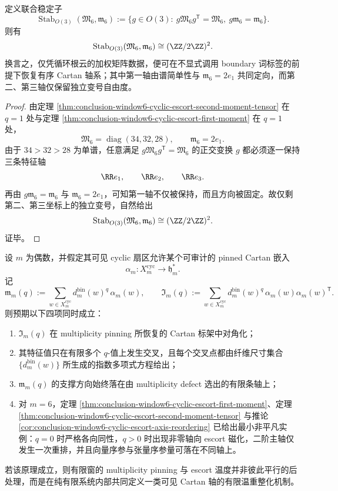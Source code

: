 \begin{corollary}\label{cor:conclusion-window6-moment-tensor-axis-pinning}
定义联合稳定子
\[
\operatorname{Stab}_{O(3)}(\mathfrak M_6,\mathfrak m_6)
:=
\bigl\{
g\in O(3):
\ g\mathfrak M_6 g^{\mathsf T}=\mathfrak M_6,\ 
g\mathfrak m_6=\mathfrak m_6
\bigr\}.
\]
则有
\[
\operatorname{Stab}_{O(3)}(\mathfrak M_6,\mathfrak m_6)\cong (\ZZ/2\ZZ)^2.
\]
换言之，仅凭循环根云的加权矩阵数据，便可在不显式调用 boundary 词标签的前提下恢复有序 Cartan 轴系；其中第一轴由谱简单性与 \(\mathfrak m_6=2e_1\) 共同定向，而第二、第三轴仅保留独立变号自由度。
\end{corollary}
\begin{proof}
由定理 \ref{thm:conclusion-window6-cyclic-escort-second-moment-tensor} 在 \(q=1\) 处与定理 \ref{thm:conclusion-window6-cyclic-escort-first-moment} 在 \(q=1\) 处，
\[
\mathfrak M_6=\operatorname{diag}(34,32,28),
\qquad
\mathfrak m_6=2e_1.
\]
由于 \(34>32>28\) 为单谱，任意满足 \(g\mathfrak M_6 g^{\mathsf T}=\mathfrak M_6\) 的正交变换 \(g\) 都必须逐一保持三条特征轴
\[
\RR e_1,\qquad \RR e_2,\qquad \RR e_3.
\]
再由 \(g\mathfrak m_6=\mathfrak m_6\) 与 \(\mathfrak m_6=2e_1\)，可知第一轴不仅被保持，而且方向被固定。故仅剩第二、第三坐标上的独立变号，自然给出
\[
\operatorname{Stab}_{O(3)}(\mathfrak M_6,\mathfrak m_6)\cong (\ZZ/2\ZZ)^2.
\]
证毕。
\end{proof}

\begin{conjecture}\label{conj:conclusion-window6-escort-weyl-renormalization}
设 \(m\) 为偶数，并假定其可见 cyclic 扇区允许某个可审计的 pinned Cartan 嵌入
\[
\alpha_m:X_m^{\mathrm{cyc}}\to \mathfrak h_m^\ast.
\]
记
\[
\mathfrak m_m(q)
:=
\sum_{w\in X_m^{\mathrm{cyc}}} d_m^{\mathrm{bin}}(w)^q\,\alpha_m(w),
\qquad
\mathfrak I_m(q)
:=
\sum_{w\in X_m^{\mathrm{cyc}}} d_m^{\mathrm{bin}}(w)^q\,\alpha_m(w)\alpha_m(w)^{\mathsf T}.
\]
则预期以下四项同时成立：
\begin{enumerate}
  \item \(\mathfrak I_m(q)\) 在 multiplicity pinning 所恢复的 Cartan 标架中对角化；
  \item 其特征值只在有限多个 \(q\)-值上发生交叉，且每个交叉点都由纤维尺寸集合 \(\{d_m^{\mathrm{bin}}(w)\}\) 所生成的指数多项式方程给出；
  \item \(\mathfrak m_m(q)\) 的支撑方向始终落在由 multiplicity defect 选出的有限条轴上；
  \item 对 \(m=6\)，定理 \ref{thm:conclusion-window6-cyclic-escort-first-moment}、定理 \ref{thm:conclusion-window6-cyclic-escort-second-moment-tensor} 与推论 \ref{cor:conclusion-window6-cyclic-escort-axis-reordering} 已给出最小非平凡实例：\(q=0\) 时严格各向同性，\(q>0\) 时出现非零轴向 escort 磁化，二阶主轴仅发生一次重排，并且向量序参与张量序参量可落在不同轴上。
\end{enumerate}
若该原理成立，则有限窗的 multiplicity pinning 与 escort 温度并非彼此平行的后处理，而是在纯有限系统内部共同定义一类可见 Cartan 轴的有限温重整化机制。
\end{conjecture}

